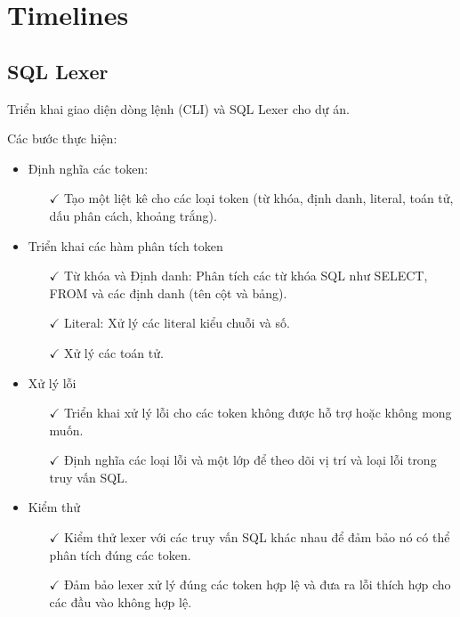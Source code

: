 \documentclass{beamer}
\begin{document}
	
	\section{Timelines}
	
	\subsection{SQL Lexer}
	
	\begin{frame}	
		\begin{tcolorbox}[colback=yellow!10!white,colframe=red!75!black,title= Mục tiêu]
		Triển khai giao diện dòng lệnh (CLI) và SQL Lexer cho dự án.
		\end{tcolorbox}
		Các bước thực hiện:
		\begin{itemize}
			\item Định nghĩa các token: 
			\begin{itemize}
				\item[$\checkmark$] Tạo một liệt kê cho các loại token (từ khóa, định danh, literal, toán tử, dấu phân cách, khoảng trắng).
			\end{itemize}
			\item Triển khai các hàm phân tích token
			\begin{itemize}
				\item[$\checkmark$] Từ khóa và Định danh: Phân tích các từ khóa SQL như SELECT, FROM và các định danh (tên cột và bảng).
				\item[$\checkmark$] Literal: Xử lý các literal kiểu chuỗi và số.
				\item[$\checkmark$]  Xử lý các toán tử.
			\end{itemize}
		\end{itemize}
				
	\end{frame}
	\begin{frame}
		\begin{itemize}
			\item Xử lý lỗi
			\begin{itemize}
				\item[$\checkmark$] Triển khai xử lý lỗi cho các token không được hỗ trợ hoặc không mong muốn.
				\item[$\checkmark$] Định nghĩa các loại lỗi và một lớp để theo dõi vị trí và loại lỗi trong truy vấn SQL.
			\end{itemize}
			\item Kiểm thử
			\begin{itemize}
				\item[$\checkmark$] Kiểm thử lexer với các truy vấn SQL khác nhau để đảm bảo nó có thể phân tích đúng các token.
				\item[$\checkmark$] Đảm bảo lexer xử lý đúng các token hợp lệ và đưa ra lỗi thích hợp cho các đầu vào không hợp lệ.
			\end{itemize}
		\end{itemize}
	\end{frame}
	
\end{document}
